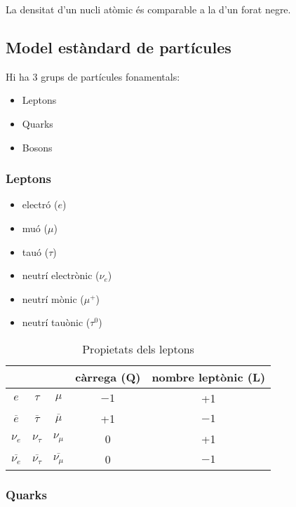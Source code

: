 La densitat d'un nucli atòmic és comparable a la d'un forat negre.

\subsection{Model estàndard de partícules}
\label{sub:model_estandard_de_particules}

Hi ha 3 grups de partícules fonamentals:

\begin{itemize}
    \item Leptons
    \item Quarks
    \item Bosons
\end{itemize}

\subsubsection{Leptons}
\label{ssub:leptons}

\begin{itemize}
    \item electró ($e$)
    \item muó ($\mu$)
    \item tauó ($\tau$)
    \item neutrí electrònic ($\nu_e$)
    \item neutrí mònic ($\mu^+$)
    \item neutrí tauònic ($\tau^0$)
\end{itemize}

\begin{table}[H]
    \centering
    \caption{Propietats dels leptons}
    \label{tab:propietats_dels_leptons}
    \begin{tabular}{ccccc}
        \toprule
        & & & càrrega (Q) & nombre leptònic (L) \\
        \midrule
        $e$ & $\tau$ & $\mu$ & $-1$ & +1 \\
        $\overline{e}$ & $\overline{\tau}$ & $\overline{\mu}$ & +1 & $-1$ \\
        $\nu_e$ & $\nu_\tau$ & $\nu_\mu$ & 0 & +1 \\
        $\overline{\nu_e}$ & $\overline{\nu_\tau}$ & $\overline{\nu_\mu}$ & 0 & $-1$ \\
        \bottomrule
    \end{tabular}
\end{table}

\subsubsection{Quarks}
\label{ssub:quarks}

